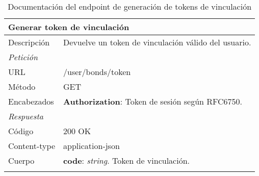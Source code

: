 \begin{longtable}{|p{} p{}|}
    \hline
    \multicolumn{2}{|l|}{\textbf{Generar token de vinculación}} \\ \hline 
    Descripción         & Devuelve un token de vinculación válido del usuario. \\ \hline \hline
    \multicolumn{2}{|l|}{\emph{Petición}}  \\ \hline 
    URL      & /user/bonds/token \\ \hline
    Método   & GET                  \\ \hline
    Encabezados  & 
    \textbf{Authorization}: Token de sesión según RFC6750. \\ \hline  \hline
    \multicolumn{2}{|l|}{\emph{Respuesta}} \\ \hline 
    Código          & 200 OK         \\ \hline
    Content-type    & application-json  \\ \hline
    Cuerpo  & 
    \textbf{code}: \emph{string}. Token de vinculación. \\ \hline
    \caption{Documentación del endpoint de generación de tokens de vinculación}
    \label{api:generar_token_vinculacion}
\end{longtable}

